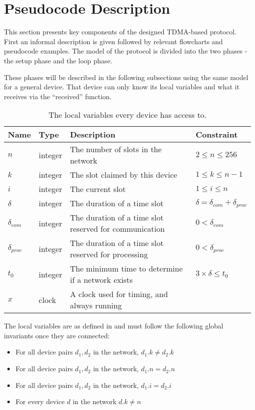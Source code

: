 \section{Pseudocode Description}
This section presents key components of the designed TDMA-based protocol. 
First an informal description is given followed by relevant flowcharts and pseudocode examples. 
The model of the protocol is divided into the two phases - the setup phase and the loop phase. 

These phases will be described in the following subsections using the same model for a general device. 
That device can only know its local variables and what it receives via the \enquote{received} function.

\begin{table}[H]
    \begin{tabularx}{\textwidth}{l|l|X|l}
        \toprule
        Name                & Type      & Description & Constraint \\
        \midrule
        $n$                 & integer   & The number of slots in the network                        & $2 \leq n \leq 256$\\
        $k$                 & integer   & The slot claimed by this device                           & $1 \leq k \leq n - 1$\\
        $i$                 & integer   & The current slot                                          & $1 \leq i \leq n$\\
        $\delta$            & integer   & The duration of a time slot                               & $\delta = \delta_{com} + \delta_{proc}$\\
        $\delta_{com}$      & integer   & The duration of a time slot reserved for communication    & $0 < \delta_{com}$ \\
        $\delta_{proc}$     & integer   & The duration of a time slot reserved for processing       & $0 < \delta_{proc}$ \\
        $t_0$               & integer   & The minimum time to determine if a network exists         & $3 \times \delta \leq t_0$ \\
        $x$                 & clock     & A clock used for timing, and always running\\
        \bottomrule
    \end{tabularx}
    \caption{The local variables every device has access to.}
    \label{tab:locals}
\end{table}

The local variables are as defined in  and must follow the following global invariants once they are connected:
\begin{itemize}
\item For all device pairs ${d_1, d_2}$ in the network, $d_1.k \neq d_2.k$
\item For all device pairs ${d_1, d_2}$ in the network, $d_1.n = d_2.n$
\item For all device pairs ${d_1, d_2}$ in the network, $d_1.i = d_2.i$
\item For every device $d$ in the network $d.k \neq n$
\end{itemize}

